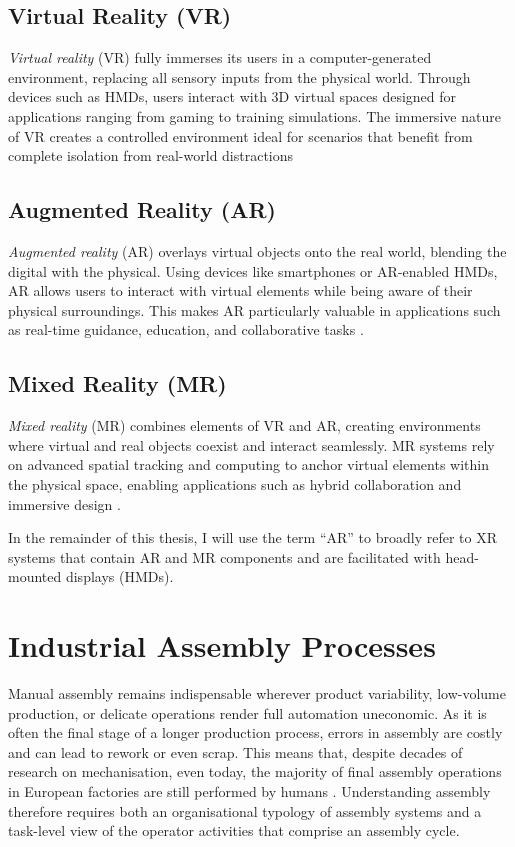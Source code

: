 \subsection{Virtual Reality (VR)}
\textit{Virtual reality} (VR) fully immerses its users in a computer-generated environment, replacing all sensory inputs from the physical world. Through devices such as HMDs, users interact with 3D virtual spaces designed for applications ranging from gaming to training simulations. The immersive nature of VR creates a controlled environment ideal for scenarios that benefit from complete isolation from real-world distractions \cite{doerner2022xrTextbook}

\subsection{Augmented Reality (AR)}
\textit{Augmented reality} (AR) overlays virtual objects onto the real world, blending the digital with the physical. Using devices like smartphones or AR-enabled HMDs, AR allows users to interact with virtual elements while being aware of their physical surroundings. This makes AR particularly valuable in applications such as real-time guidance, education, and collaborative tasks \cite{doerner2022xrTextbook}.

\subsection{Mixed Reality (MR)}
\textit{Mixed reality} (MR) combines elements of VR and AR, creating environments where virtual and real objects coexist and interact seamlessly. MR systems rely on advanced spatial tracking and computing to anchor virtual elements within the physical space, enabling applications such as hybrid collaboration and immersive design \cite{doerner2022xrTextbook}.
\vspace{4mm}

In the remainder of this thesis, I will use the term ``AR'' to broadly refer to XR systems that contain AR and MR components and are facilitated with head-mounted displays (HMDs).


\section{Industrial Assembly Processes}\label{sec:assembly}
Manual assembly remains indispensable wherever product variability,
low-volume production, or delicate operations render full automation
uneconomic. As it is often the final stage of a longer production process, errors in assembly are costly and can lead to rework or even scrap. This means that, despite decades of research on mechanisation, even today, the majority of final assembly operations in European factories are still performed by humans
\cite{fast2016evaluating}
\cite{claeys2015framework}.
Understanding assembly therefore requires both
an organisational typology of assembly systems and a task-level view
of the operator activities that comprise an assembly cycle.

